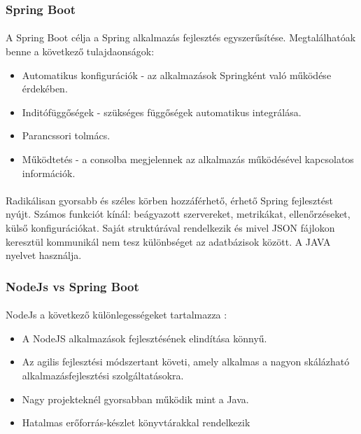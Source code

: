 \documentclass{article}
\begin{document}
	
	\subsubsection{Spring Boot}
	\paragraph{}
	A Spring Boot célja a Spring alkalmazás fejlesztés egyszerűsítése. Megtalálhatóak benne a következő tulajdaonságok:
	\begin{itemize}
		\item Automatikus konfigurációk - az alkalmazások Springként való működése érdekében.
		\item Inditófüggőségek - szükséges függőségek automatikus integrálása.
		\item Parancssori tolmács.
		\item Működtetés - a consolba megjelennek az alkalmazás működésével kapcsolatos információk.
	\end{itemize}
	
	\paragraph{}
	Radikálisan gyorsabb és széles körben hozzáférhető, érhető Spring fejlesztést nyújt. Számos funkciót kínál: beágyazott szervereket, metrikákat, ellenőrzéseket, külső konfigurációkat. Saját struktúrával rendelkezik és mivel JSON fájlokon keresztül kommunikál nem tesz különbséget az adatbázisok között. A JAVA nyelvet használja.\cite{jovanovic2017java}
	
	\subsubsection{NodeJs vs Spring Boot}
	\paragraph{}
	NodeJs a következő különlegességeket tartalmazza \cite{nodejsspring}:
	\begin{itemize}
		\item A NodeJS alkalmazások fejlesztésének elindítása könnyű.
		\item Az agilis fejlesztési módszertant követi, amely alkalmas a nagyon skálázható alkalmazásfejlesztési szolgáltatásokra.
		\item Nagy projekteknél gyorsabban működik mint a Java.
		\item Hatalmas erőforrás-készlet könyvtárakkal rendelkezik
	\end{itemize}
	
\end{document}
